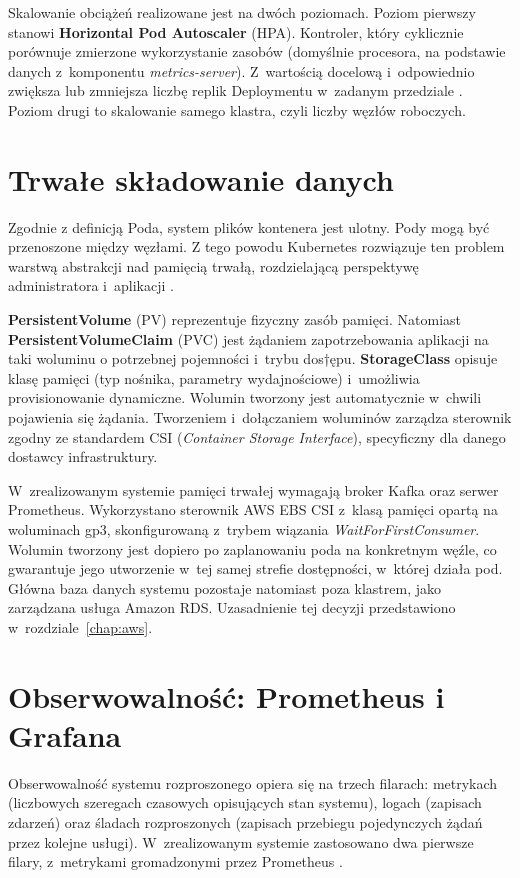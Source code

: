 Skalowanie obciążeń realizowane jest na dwóch poziomach. Poziom pierwszy stanowi \textbf{Horizontal Pod Autoscaler}
(HPA). Kontroler, który cyklicznie porównuje zmierzone wykorzystanie zasobów (domyślnie procesora, na podstawie
danych z~komponentu \emph{metrics-server}). Z~wartością docelową i~odpowiednio zwiększa lub zmniejsza liczbę replik
Deploymentu w~zadanym przedziale \parencite{k8sdocs}. Poziom drugi to skalowanie samego klastra, czyli liczby węzłów
roboczych.

\section{Trwałe składowanie danych}
\label{sec:trwale-skladowanie-danych}

Zgodnie z definicją Poda, system plików kontenera jest ulotny. Pody mogą być przenoszone między węzłami.
Z tego powodu Kubernetes rozwiązuje ten problem warstwą abstrakcji nad pamięcią trwałą, 
rozdzielającą perspektywę administratora i~aplikacji \parencite{k8sdocs}.

\textbf{PersistentVolume} (PV) reprezentuje fizyczny zasób pamięci. Natomiast \textbf{PersistentVolumeClaim} (PVC) 
jest żądaniem zapotrzebowania aplikacji na taki woluminu o potrzebnej pojemności i~trybu dos†ępu.
\textbf{StorageClass} opisuje klasę pamięci (typ nośnika, parametry wydajnościowe) i~umożliwia provisionowanie dynamiczne.
Wolumin tworzony jest automatycznie w~chwili pojawienia się żądania. Tworzeniem i~dołączaniem
woluminów zarządza sterownik zgodny ze standardem CSI (\emph{Container Storage Interface}), specyficzny dla danego
dostawcy infrastruktury.

W~zrealizowanym systemie pamięci trwałej wymagają broker Kafka oraz serwer Prometheus. Wykorzystano sterownik
AWS EBS CSI z~klasą pamięci opartą na woluminach gp3, skonfigurowaną z~trybem wiązania
\emph{WaitForFirstConsumer}. Wolumin tworzony jest dopiero po zaplanowaniu poda na konkretnym węźle, co
gwarantuje jego utworzenie w~tej samej strefie dostępności, w~której działa pod. Główna baza danych systemu
pozostaje natomiast poza klastrem, jako zarządzana usługa Amazon RDS. Uzasadnienie tej decyzji przedstawiono
w~rozdziale~\ref{chap:aws}.

\section{Obserwowalność: Prometheus i Grafana}
\label{sec:obserwowalnosc-prometheus-grafana}

Obserwowalność systemu rozproszonego opiera się na trzech filarach: metrykach (liczbowych szeregach czasowych
opisujących stan systemu), logach (zapisach zdarzeń) oraz śladach rozproszonych (zapisach przebiegu pojedynczych
żądań przez kolejne usługi). W~zrealizowanym systemie zastosowano dwa pierwsze filary, z~metrykami gromadzonymi
przez Prometheus \parencite{prometheusdocs}.


